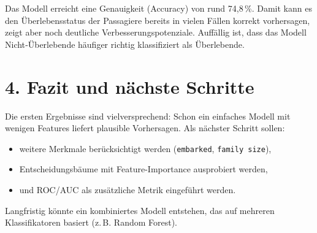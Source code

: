 \documentclass[12pt,a4paper]{article}
\begin{document}
Das Modell erreicht eine Genauigkeit (Accuracy) von rund 74{,}8\,\%. Damit kann es den Überlebensstatus der Passagiere bereits in vielen Fällen korrekt vorhersagen, zeigt aber noch deutliche Verbesserungspotenziale. 
Auffällig ist, dass das Modell Nicht‑Überlebende häufiger richtig klassifiziert als Überlebende.

\section*{4. Fazit und nächste Schritte}

Die ersten Ergebnisse sind vielversprechend: Schon ein einfaches Modell mit wenigen Features liefert plausible Vorhersagen. Als nächster Schritt sollen:

\begin{itemize}
    \item weitere Merkmale berücksichtigt werden (\texttt{embarked}, \texttt{family size}),
    \item Entscheidungsbäume mit Feature-Importance ausprobiert werden,
    \item und ROC/AUC als zusätzliche Metrik eingeführt werden.
\end{itemize}

Langfristig könnte ein kombiniertes Modell entstehen, das auf mehreren Klassifikatoren basiert (z.\,B. Random Forest).
\end{document}
